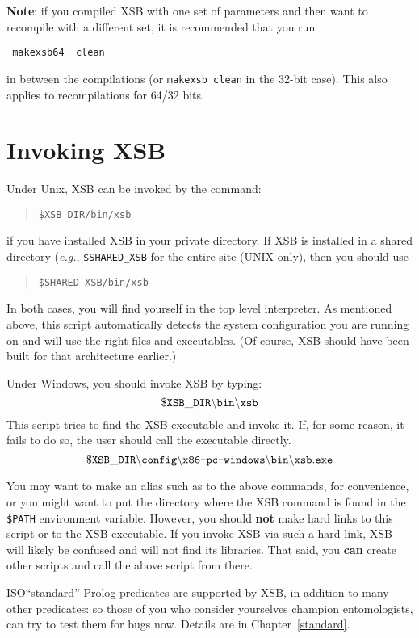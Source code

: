 \noindent
{\bf Note}: if you compiled XSB with one set of parameters and then want to
recompile with a different set, it is recommended that you run
\begin{verbatim}
 makexsb64  clean  
\end{verbatim}
in between the compilations (or \texttt{makexsb clean} in the 32-bit
case).  
This also applies to recompilations for 64/32 bits.


\section{Invoking XSB}

Under Unix, XSB can be invoked by the command:
\begin{quote}
       \tt \$XSB\_DIR/bin/xsb
\end{quote}
if you have installed XSB in your private directory.  If XSB is
installed in a shared directory ({\it e.g.}, {\tt \$SHARED\_XSB} for
the entire site (UNIX only), then you should use
\begin{quote}
       \tt \$SHARED\_XSB/bin/xsb
\end{quote}
In both cases, you will find yourself in the top level interpreter.  
As mentioned above, this script automatically detects the system
configuration you are running on and will use the right files and
executables. (Of course, XSB should have been built for that architecture
earlier.)

Under Windows, you should invoke XSB by typing:
\[
 \tt
 \$XSB\_DIR\backslash{}bin\backslash{}xsb
\]
This script tries to find the XSB executable and invoke it. If, for some
reason, it fails to do so, the user should call the executable directly.
\[
 \tt
 \$XSB\_DIR\backslash{}config\backslash\texttt{x86-pc-windows}\backslash{}bin\backslash{}xsb.exe
\]


You may want to make an alias such as {\tt \smallourprolog} to the above
commands, for convenience, or you might want to put the directory where the
XSB command is found in the {\tt \$PATH} environment variable. However, you
should {\bf not} make hard links to this script or to the XSB executable.
If you invoke XSB via such a hard link, XSB will likely be confused and will
not find its libraries.  That said, you {\bf can} create other scripts and
call the above script from there.

ISO``standard'' Prolog predicates are supported by XSB, in addition to
many other predicates: so those of you who consider yourselves
champion entomologists, can try to test them for bugs now.  Details
are in Chapter~\ref{standard}.


